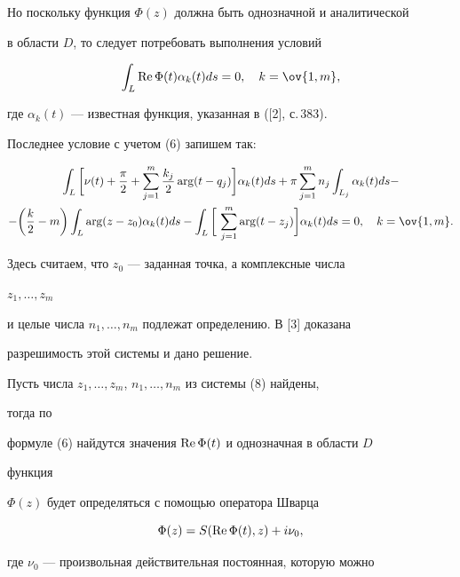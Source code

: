 Но поскольку функция $\Phi(z)$ должна быть однозначной и аналитической 


в области $D$, то следует потребовать выполнения условий


\begin{equation} 


\int_L\re\Phi(t)\alpha_k(t)ds=0,\quad k=\ov{1,m}, 


\end{equation} 


где $\alpha_k(t)$ --- известная функция, указанная в ([2], с.\,383). 


Последнее условие с учетом (6) запишем так:


\begin{multline} 


\int_L\bigg[\nu(t)+\frac{\pi}{2}+\sum^m_{j=1} 


\frac{k_j}{2}\arg(t-q_j)\bigg]\alpha_k(t)ds+\pi 


\sum^m_{j=1}n_j\int_{L_j}\alpha_k(t)ds -\\ 


% 


-\bigg(\frac{k}{2}-m\bigg)\int_L\arg(z-z_0)\alpha_k(t)ds- 


\int_L\bigg[\,\sum^m_{j=1}\arg(t-z_j)\bigg] 


\alpha_k(t)ds=0,\quad k=\ov{1,m}. 


\end{multline} 


Здесь считаем, что $z_0$ --- заданная точка, а комплексные числа 


$z_1,\dotsc,z_m$ 


и целые числа $n_1,\dotsc,n_m$ подлежат определению. В [3] доказана 


разрешимость этой системы и дано решение. 


 


Пусть числа $z_1,\dotsc,z_m$, $n_1,\dotsc,n_m$ из системы (8) найдены, 


тогда по 


формуле (6) найдутся значения $\operatorname{Re}\Phi(t)$ и однозначная в области $D$ 


функция 


$\Phi(z)$ будет определяться с помощью оператора Шварца 


$$ 


\Phi(z)=S(\re\Phi(t),z)+i\nu_0, 


$$ 


где $\nu_0$ --- произвольная действительная постоянная, которую можно 


